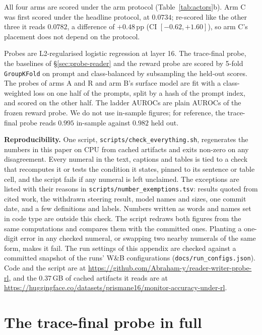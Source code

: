 \documentclass{article}
\begin{document}
All four arms are scored under the arm protocol (Table~\ref{tab:actors}b). Arm C was first scored under the headline protocol, at $0.0734$; re-scored like the other three it reads $0.0782$, a difference of $+0.48$\,pp (CI $[-0.62, +1.60]$), so arm C's placement does not depend on the protocol.


Probes are L2-regularised logistic regression at layer 16. The trace-final probe, the baselines of \S\ref{sec:probe-reader} and the reward probe are scored by 5-fold \texttt{GroupKFold} on prompt and class-balanced by subsampling the held-out scores. The probes of arms A and R and arm B's surface model are fit with a class-weighted loss on one half of the prompts, split by a hash of the prompt index, and scored on the other half. The ladder AUROCs are plain AUROCs of the frozen reward probe. We do not use in-sample figures; for reference, the trace-final probe reads $0.995$ in-sample against $0.982$ held out.

\textbf{Reproducibility.} One script, \texttt{scripts/check\_everything.sh}, regenerates the numbers in this paper on CPU from cached artifacts and exits non-zero on any disagreement. Every numeral in the text, captions and tables is tied to a check that recomputes it or tests the condition it states, pinned to its sentence or table cell, and the script fails if any numeral is left unclaimed. The exceptions are listed with their reasons in \texttt{scripts/number\_exemptions.tsv}: results quoted from cited work, the withdrawn steering result, model names and sizes, one commit date, and a few definitions and labels. Numbers written as words and names set in code type are outside this check. The script redraws both figures from the same computations and compares them with the committed ones. Planting a one-digit error in any checked numeral, or swapping two nearby numerals of the same form, makes it fail. The run settings of this appendix are checked against a committed snapshot of the runs' W\&B configurations (\texttt{docs/run\_configs.json}). Code and the script are at \url{https://github.com/Abraham-y/reader-writer-probe-rl}, and the $0.37$\,GB of cached artifacts it reads are at \url{https://huggingface.co/datasets/prismane16/monitor-accuracy-under-rl}.

\section{The trace-final probe in full}\label{app:reader}
\end{document}
